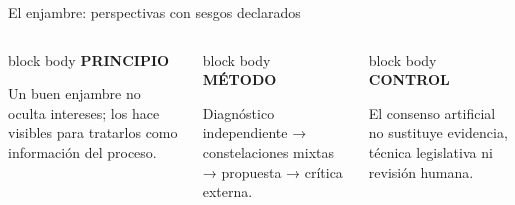 \documentclass[aspectratio=169,10pt]{beamer}
\newcommand{\sidecard}[3]{%
  \begin{beamercolorbox}[rounded=true,sep=0.50em,wd=3.28cm]{block body}
    {\color{#1}\scriptsize\bfseries #2}\par\smallskip
    {\color{IdeaInk}\scriptsize #3}
  \end{beamercolorbox}}
\begin{document}
\begin{frame}{El enjambre: perspectivas con sesgos declarados}
\begin{columns}[T,onlytextwidth]

\sidecard{JudgeTeal}{PRINCIPIO}{Un buen enjambre no oculta intereses; los hace visibles para tratarlos como información del proceso.}

\vspace{0.15cm}

\sidecard{CambridgeGold}{MÉTODO}{Diagnóstico independiente → constelaciones mixtas → propuesta → crítica externa.}

\vspace{0.15cm}

\sidecard{SafeRed}{CONTROL}{El consenso artificial no sustituye evidencia, técnica legislativa ni revisión humana.}

\end{columns}

\end{frame}



\end{document}
